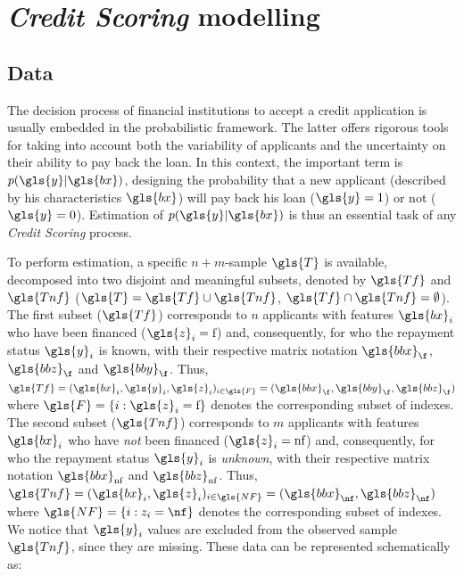 \section{\textit{Credit Scoring} modelling} \label{sec:criteres}

\subsection{Data} 

The decision process of financial institutions to accept a credit application is usually embedded in the  probabilistic framework. The latter offers rigorous tools for taking into account both the variability of applicants and the uncertainty on their ability to pay back the loan. In this context, the important term is $p(\gls{y}|\gls{bx})$, designing the probability that a new applicant (described by his characteristics $\gls{bx}$) will pay back his loan ($\gls{y}=1$) or not ($\gls{y}=0$). Estimation of $p(\gls{y}|\gls{bx})$ is thus an essential task of any \textit{Credit Scoring} process.

To perform estimation, a specific $n + m$-sample $\gls{T}$ is available, decomposed into two disjoint and meaningful subsets, denoted by $\gls{Tf}$ and $\gls{Tnf}$ ($\gls{T}=\gls{Tf} \cup \gls{Tnf}$, $\gls{Tf} \cap \gls{Tnf}=\emptyset$). The first subset ($\gls{Tf}$) corresponds to $n$ applicants with features $\gls{bx}_i$ who have been financed ($\gls{z}_i={\text{f}}$) and, consequently, for who the repayment status $\gls{y}_i$ is known, with their respective matrix notation $\gls{bbx}_\f$, $\gls{bbz}_\f$ and $\gls{bby}_\f$. Thus, $\gls{Tf}=(\gls{bx}_i,\gls{y}_i,\gls{z}_i)_{i\in \gls{F}} = (\gls{bbx}_\f,\gls{bby}_\f,\gls{bbz}_\f)$ where $\gls{F}=\{i:\gls{z}_i={\text{f}}\}$ denotes the corresponding subset of indexes. The second subset ($\gls{Tnf}$) corresponds to $m$ applicants with features $\gls{bx}_i$ who have {\it not} been financed ($\gls{z}_i={\text{nf}}$) and, consequently, for who the repayment status $\gls{y}_i$ is {\it unknown}, with their respective matrix notation $\gls{bbx}_{\text{nf}}$ and $\gls{bbz}_{\text{nf}}$. Thus, $\gls{Tnf}=(\gls{bx}_i,\gls{z}_i)_{i\in \gls{NF}} = (\gls{bbx}_{\nf}, \gls{bbz}_{\nf})$ where $\gls{NF}=\{i:z_i={\nf}\}$ denotes the corresponding subset of indexes. We notice that $\gls{y}_i$ values are excluded from the observed sample $\gls{Tnf}$, since they are missing. These data can be represented schematically as:

